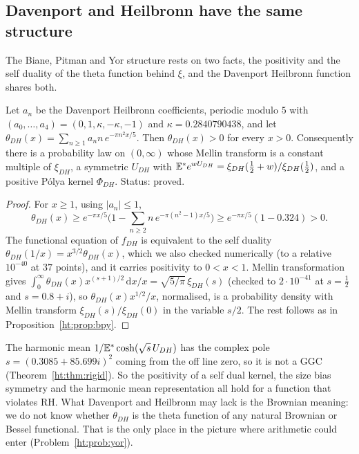\subsection{Davenport and Heilbronn have the same structure}
The Biane, Pitman and Yor structure rests on two facts, the positivity and the self duality of the theta function behind $\xi$, and the Davenport Heilbronn function shares both.

\begin{proposition}\label{ht:prop:dhtheta}
Let $a_n$ be the Davenport Heilbronn coefficients, periodic modulo $5$ with $(a_0,\dots,a_4)=(0,1,\kappa,-\kappa,-1)$ and $\kappa=0.2840790438$, and let $\theta_{DH}(x)=\sum_{n\ge1}a_nn\,e^{-\pi n^2x/5}$. Then $\theta_{DH}(x)>0$ for every $x>0$. Consequently there is a probability law on $(0,\infty)$ whose Mellin transform is a constant multiple of $\xi_{DH}$, a symmetric $U_{DH}$ with $\mathbb{E}^*e^{wU_{DH}}=\xi_{DH}(\frac12+w)/\xi_{DH}(\frac12)$, and a positive P\'olya kernel $\Phi_{DH}$. Status: proved.
\end{proposition}

\begin{proof}
For $x\ge1$, using $|a_n|\le1$,
\[
\theta_{DH}(x)\ge e^{-\pi x/5}\Big(1-\sum_{n\ge2}n\,e^{-\pi(n^2-1)x/5}\Big)\ge e^{-\pi x/5}(1-0.324)>0 .
\]
The functional equation of $f_{DH}$ is equivalent to the self duality $\theta_{DH}(1/x)=x^{3/2}\theta_{DH}(x)$, which we also checked numerically (to a relative $10^{-40}$ at $37$ points), and it carries positivity to $0<x<1$. Mellin transformation gives $\int_0^\infty\theta_{DH}(x)x^{(s+1)/2}\,\mathrm dx/x=\sqrt{5/\pi}\,\xi_{DH}(s)$ (checked to $2\cdot10^{-41}$ at $s=\frac12$ and $s=0.8+i$), so $\theta_{DH}(x)x^{1/2}/x$, normalised, is a probability density with Mellin transform $\xi_{DH}(s)/\xi_{DH}(0)$ in the variable $s/2$. The rest follows as in Proposition~\ref{ht:prop:bpy}.
\end{proof}

The harmonic mean $1/\mathbb{E}^*\cosh(\sqrt s\,U_{DH})$ has the complex pole $s=(0.3085+85.699i)^2$ coming from the off line zero, so it is not a GGC (Theorem~\ref{ht:thm:rigid}). So the positivity of a self dual kernel, the size bias symmetry and the harmonic mean representation all hold for a function that violates RH. What Davenport and Heilbronn may lack is the Brownian meaning: we do not know whether $\theta_{DH}$ is the theta function of any natural Brownian or Bessel functional. That is the only place in the picture where arithmetic could enter (Problem~\ref{ht:prob:yor}).

